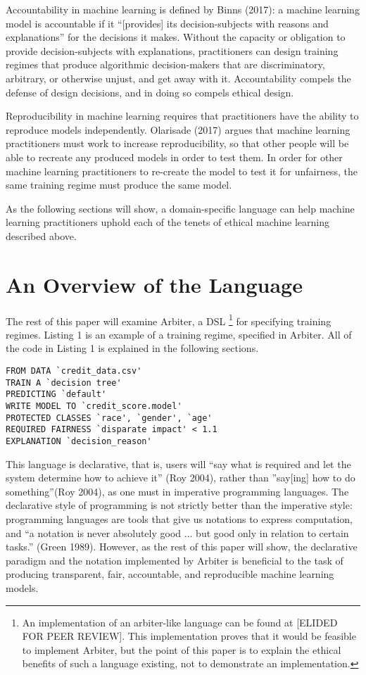 \documentclass[letterpaper]{article}
\begin{document}
Accountability in machine learning is defined by Binns (2017): a machine learning model is accountable if it ``[provides] its decision-subjects with reasons and explanations” for the decisions it makes. Without the capacity or obligation to provide decision-subjects with explanations, practitioners can design training regimes that produce algorithmic decision-makers that are discriminatory, arbitrary, or otherwise unjust, and get away with it. Accountability compels the defense of design decisions, and in doing so compels ethical design.

Reproducibility in machine learning requires that practitioners have the ability to reproduce models independently. Olarisade (2017) argues that machine learning practitioners must work to increase reproducibility, so that other people will be able to recreate any produced models in order to test them. In order for other machine learning practitioners to re-create the model to test it for unfairness, the same training regime must produce the same model.

As the following sections will show, a domain-specific language can help machine learning practitioners uphold each of the tenets of ethical machine learning described above.

\section{An Overview of the Language}
The rest of this paper will examine Arbiter, a DSL \footnote{An implementation of an arbiter-like language can be found at [ELIDED FOR PEER REVIEW]. This implementation proves that it would be feasible to implement Arbiter, but the point of this paper is to explain the ethical benefits of such a language existing, not to demonstrate an implementation.} for specifying training regimes. Listing 1 is an example of a training regime, specified in Arbiter. All of the code in Listing 1 is explained in the following sections.

\begin{lstlisting}[caption=Arbiter example.]
FROM DATA `credit_data.csv'
TRAIN A `decision tree'
PREDICTING `default'
WRITE MODEL TO `credit_score.model'
PROTECTED CLASSES `race', `gender', `age'
REQUIRED FAIRNESS `disparate impact' < 1.1
EXPLANATION `decision_reason'
\end{lstlisting}

This language is declarative, that is, users will ``say what is required and let the system determine how to achieve it” (Roy 2004), rather than ''say[ing] how to do something”(Roy 2004), as one must in imperative programming languages. The declarative style of programming is not strictly better than the imperative style: programming languages are tools that give us notations to express computation, and “a notation is never absolutely good ... but good only in relation to certain tasks.” (Green 1989). However, as the rest of this paper will show, the declarative paradigm and the notation implemented by Arbiter is beneficial to the task of producing transparent, fair, accountable, and reproducible machine learning models. 
\end{document}
